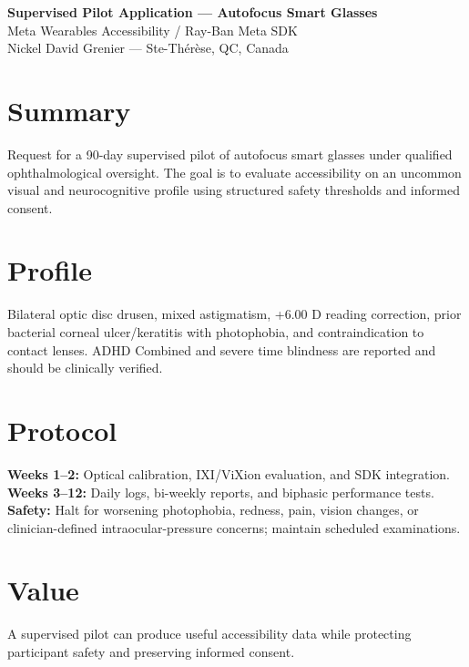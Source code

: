 \documentclass[11pt]{article}
\begin{document}
\begin{center}
{\Large \textbf{Supervised Pilot Application --- Autofocus Smart Glasses}}\\[6pt]
Meta Wearables Accessibility / Ray-Ban Meta SDK\\
Nickel David Grenier --- Ste-Thérèse, QC, Canada
\end{center}
\section*{Summary}
Request for a 90-day supervised pilot of autofocus smart glasses under qualified ophthalmological oversight. The goal is to evaluate accessibility on an uncommon visual and neurocognitive profile using structured safety thresholds and informed consent.
\section*{Profile}
Bilateral optic disc drusen, mixed astigmatism, +6.00 D reading correction, prior bacterial corneal ulcer/keratitis with photophobia, and contraindication to contact lenses. ADHD Combined and severe time blindness are reported and should be clinically verified.
\section*{Protocol}
\textbf{Weeks 1--2:} Optical calibration, IXI/ViXion evaluation, and SDK integration.\\
\textbf{Weeks 3--12:} Daily logs, bi-weekly reports, and biphasic performance tests.\\
\textbf{Safety:} Halt for worsening photophobia, redness, pain, vision changes, or clinician-defined intraocular-pressure concerns; maintain scheduled examinations.
\section*{Value}
A supervised pilot can produce useful accessibility data while protecting participant safety and preserving informed consent.
\end{document}
